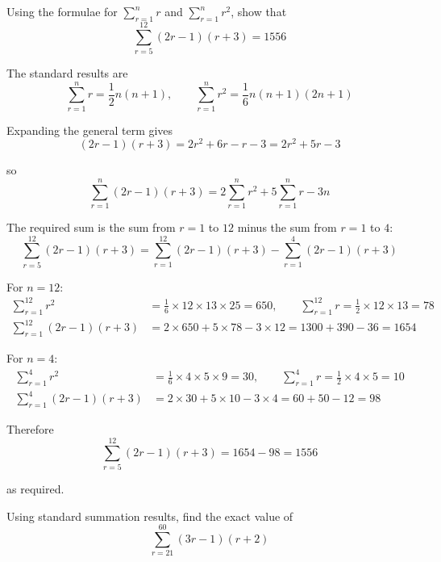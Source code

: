 \documentclass[leqno]{article}
\begin{document}
\djsFrontMatter
\begin{enumerate}[
  label=\textbf{\arabic*.},
  leftmargin=*,
  topsep=0pt,
  partopsep=0pt,
  parsep=0pt
]

\questionitem

Using the formulae for $\sum_{r=1}^{n} r$ and $\sum_{r=1}^{n} r^2$, show that
\[\sum_{r=5}^{12} (2r-1)(r+3) = 1556\] 

\vspace*{10pt}

\begin{djsSolution}
The standard results are
\[
\sum_{r=1}^{n} r=\frac12 n(n+1),\qquad \sum_{r=1}^{n} r^2=\frac16 n(n+1)(2n+1)
\]

Expanding the general term gives
\[
(2r-1)(r+3)=2r^2+6r-r-3=2r^2+5r-3
\]

so
\[
\sum_{r=1}^{n}(2r-1)(r+3)=2\sum_{r=1}^{n} r^2+5\sum_{r=1}^{n} r-3n
\]

The required sum is the sum from \(r=1\) to \(12\) minus the sum from \(r=1\) to \(4\):
\[
\sum_{r=5}^{12}(2r-1)(r+3)=\sum_{r=1}^{12}(2r-1)(r+3)-\sum_{r=1}^{4}(2r-1)(r+3)
\]

For \(n=12\):
\begin{align*}
\sum_{r=1}^{12} r^2&=\frac16\times12\times13\times25=650,\qquad \sum_{r=1}^{12} r=\frac12\times12\times13=78\\
\sum_{r=1}^{12}(2r-1)(r+3)&=2\times650+5\times78-3\times12=1300+390-36=1654
\end{align*}

For \(n=4\):
\begin{align*}
\sum_{r=1}^{4} r^2&=\frac16\times4\times5\times9=30,\qquad \sum_{r=1}^{4} r=\frac12\times4\times5=10\\
\sum_{r=1}^{4}(2r-1)(r+3)&=2\times30+5\times10-3\times4=60+50-12=98
\end{align*}

Therefore
\[
\sum_{r=5}^{12}(2r-1)(r+3)=1654-98=1556
\]

as required.
\end{djsSolution}

\newpage

\questionitem

Using standard summation results, find the exact value of
\[\sum_{r=21}^{60} (3r-1)(r+2)\] 

\vspace*{10pt}


\end{enumerate}
\end{document}
